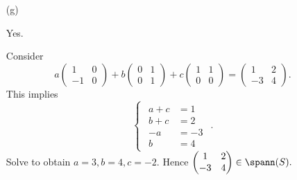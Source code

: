 \begin{Exercise}
\begin{enumerate}[(a)]
		\item[(g)]
		\begin{answer}
			Yes.
		\end{answer}
		\begin{solution}
			Consider
			$$
			a\begin{pmatrix}
			1 & 0 \\
			-1 & 0
			\end{pmatrix} + b\begin{pmatrix}
			0 & 1 \\
			0 & 1
			\end{pmatrix} + c\begin{pmatrix}
			1 & 1 \\
			0 & 0
			\end{pmatrix} = \begin{pmatrix}
			1 & 2 \\
			-3 & 4
			\end{pmatrix}.
			$$
			This implies
			$$
			\begin{cases}
			\begin{aligned}
			a+c &= 1 \\
			b+c &= 2 \\
			-a &= -3 \\
			b &= 4
			\end{aligned}
			\end{cases}.
			$$
			Solve to obtain $a=3,b=4,c=-2$. Hence
			$
			\begin{pmatrix}
			1 & 2 \\
			-3 & 4
			\end{pmatrix} \in \spann(S).
			$
		\end{solution}
		

\end{enumerate}
\end{Exercise}
